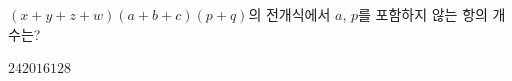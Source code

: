 \hspace*{2mm}\begin{minipage}[t]{\dimexpr\linewidth-2mm\relax}\vspace{0pt}
$(x+y+z+w)(a+b+c)(p+q)$의 전개식에서 $a$, $p$를 포함하지 않는 항의 개수는?
\begin{choices32}{$24$}{$20$}{$16$}{$12$}{$8$}\end{choices32}\end{minipage}
